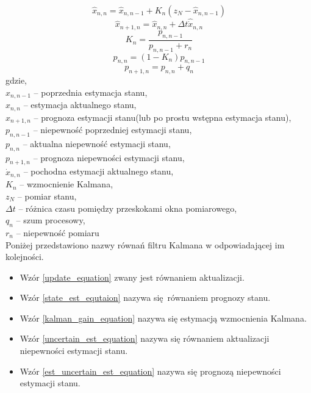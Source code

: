 {{{        \begin{equation}\label{update_equation}
              \hat{x}_{n,n}=\hat{x}_{n,n-1}+K_n(z_N - \hat{x}_{n,n-1})
        \end{equation}
        \begin{equation}\label{state_est_equtaion}
            \hat{x}_{n+1,n}=\hat{x}_{n,n} + \Delta t \hat{\dot{x}}_{n,n}
        \end{equation}
        \begin{equation}\label{kalman_gain_equation}
            K_n=\frac{p_{n,n-1}}{p_{n,n-1} + r_n}
        \end{equation}
        \begin{equation}\label{uncertain_est_equation}
            p_{n,n}=(1-K_n)p_{n,n-1}
        \end{equation}
        \begin{equation}\label{est_uncertain_est_equation}
            p_{n+1,n}=p_{n,n}+q_n
        \end{equation}
        gdzie,\\
        $\hat{x}_{n,n-1}$ -- poprzednia estymacja stanu,\\
        $\hat{x}_{n,n}$ -- estymacja aktualnego stanu,\\
        $\hat{x}_{n+1,n}$ -- prognoza estymacji stanu(lub po prostu wstępna estymacja stanu),\\
        $p_{n,n-1}$ -- niepewność poprzedniej estymacji stanu,\\
        $p_{n,n}$ -- aktualna niepewność estymacji stanu,\\
        $p_{n+1,n}$ -- prognoza niepewności estymacji stanu,\\
        $\hat{\dot{x}}_{n,n}$ -- pochodna estymacji aktualnego stanu,\\
        $K_n$ -- wzmocnienie Kalmana,\\
        $z_N$ -- pomiar stanu,\\
        $\Delta t$ -- różnica czasu pomiędzy przeskokami okna pomiarowego,\\
        $q_n$ -- szum procesowy,\\
        $r_n$ -- niepewność pomiaru\\

        Poniżej przedstawiono nazwy równań filtru Kalmana w odpowiadającej im kolejności.
        \begin{itemize}
            \item Wzór \ref{update_equation} zwany jest równaniem aktualizacji.
            \item Wzór \ref{state_est_equtaion} nazywa się równaniem prognozy stanu.
            \item Wzór \ref{kalman_gain_equation} nazywa się estymacją wzmocnienia Kalmana.
            \item Wzór \ref{uncertain_est_equation} nazywa się równaniem aktualizacji niepewności estymacji stanu.
            \item Wzór \ref{est_uncertain_est_equation} nazywa się prognozą niepewności estymacji stanu.
        \end{itemize}

}}}
